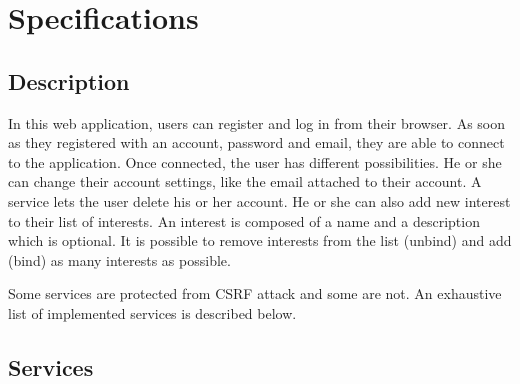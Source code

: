 \documentclass[a4paper,11pt,openany]{report}
\begin{document}
\section{Specifications}

\subsection{Description}

In this web application, users can register and log in from their browser. As soon as 
they registered with an account, password and email, they are able to connect to 
the application. Once connected, the user has different possibilities. He or she can 
change their account settings, like the email attached to their account. A service lets the 
user delete his or her account. He or she can also add new interest to their list of 
interests. An interest is composed of a name and a description which is optional. It is 
possible to remove interests from the list (unbind) and add (bind) as many interests as 
possible.

Some services are protected from CSRF attack and some are not. An exhaustive list of implemented 
services is described below.

\subsection{Services}
\end{document}
